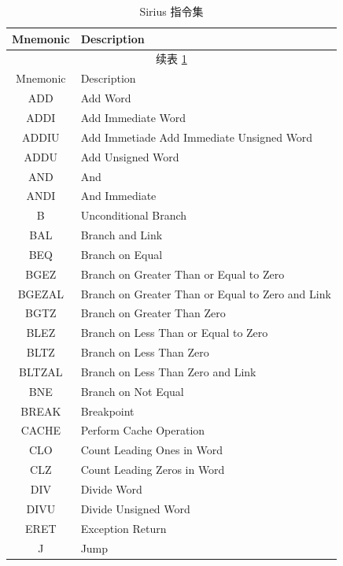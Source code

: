 \documentclass[blue,normal,cn,hide]{elegantbook}
\begin{document}
\begin{longtable}[c]{| c | l |}
    \caption{Sirius 指令集\label{long}}\\
    
    \hline
    Mnemonic & Description\\
    \hline
    \endfirsthead
    
    \hline
    \multicolumn{2}{|c|}{续表 \ref{long}}\\
    \hline
    Mnemonic  & Description\\
    \hline
    \endhead
    
    \hline
    \endfoot
    
    \hline
    \hline
    \endlastfoot
    
    ADD & Add Word \\
    ADDI & Add Immediate Word \\
    ADDIU & Add Immetiade Add Immediate Unsigned Word \\
    ADDU & Add Unsigned Word \\
    AND & And \\
    ANDI & And Immediate \\
    B & Unconditional Branch \\
    BAL & Branch and Link \\
    BEQ & Branch on Equal \\
    BGEZ & Branch on Greater Than or Equal to Zero \\
    BGEZAL & Branch on Greater Than or Equal to Zero and Link \\
    BGTZ & Branch on Greater Than Zero \\
    BLEZ & Branch on Less Than or Equal to Zero \\
    BLTZ & Branch on Less Than Zero \\
    BLTZAL & Branch on Less Than Zero and Link \\
    BNE & Branch on Not Equal \\
    BREAK & Breakpoint \\
    \rowcolor{green!20} CACHE & Perform Cache Operation \\
    \rowcolor{green!20} CLO & Count Leading Ones in Word \\
    \rowcolor{green!20} CLZ & Count Leading Zeros in Word \\
    DIV & Divide Word \\
    DIVU & Divide Unsigned Word \\
    ERET & Exception Return \\
    J & Jump \\

\end{longtable}
\end{document}

